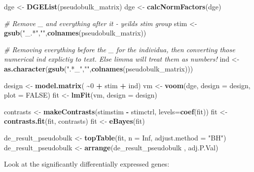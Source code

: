 \documentclass[
]{book}
\newenvironment{Shaded}{\begin{snugshade}}{\end{snugshade}}
\newcommand{\AttributeTok}[1]{\textcolor[rgb]{0.13,0.29,0.53}{#1}}
\newcommand{\CommentTok}[1]{\textcolor[rgb]{0.56,0.35,0.01}{\textit{#1}}}
\newcommand{\ConstantTok}[1]{\textcolor[rgb]{0.56,0.35,0.01}{#1}}
\newcommand{\DecValTok}[1]{\textcolor[rgb]{0.00,0.00,0.81}{#1}}
\newcommand{\FunctionTok}[1]{\textcolor[rgb]{0.13,0.29,0.53}{\textbf{#1}}}
\newcommand{\NormalTok}[1]{#1}
\newcommand{\OtherTok}[1]{\textcolor[rgb]{0.56,0.35,0.01}{#1}}
\newcommand{\SpecialCharTok}[1]{\textcolor[rgb]{0.81,0.36,0.00}{\textbf{#1}}}
\newcommand{\StringTok}[1]{\textcolor[rgb]{0.31,0.60,0.02}{#1}}
\begin{document}
\begin{Shaded}
\begin{Highlighting}[]
\NormalTok{dge }\OtherTok{\textless{}{-}} \FunctionTok{DGEList}\NormalTok{(pseudobulk\_matrix)}
\NormalTok{dge }\OtherTok{\textless{}{-}} \FunctionTok{calcNormFactors}\NormalTok{(dge)}

\CommentTok{\# Remove \_ and everything after it {-} yeilds stim group}
\NormalTok{stim }\OtherTok{\textless{}{-}} \FunctionTok{gsub}\NormalTok{(}\StringTok{"\_.*"}\NormalTok{,}\StringTok{""}\NormalTok{,}\FunctionTok{colnames}\NormalTok{(pseudobulk\_matrix)) }

\CommentTok{\# Removing everything before the \_ for the individua, then converting those numerical ind explictiy to text. Else limma will treat them as numbers!}
\NormalTok{ind  }\OtherTok{\textless{}{-}} \FunctionTok{as.character}\NormalTok{(}\FunctionTok{gsub}\NormalTok{(}\StringTok{".*\_"}\NormalTok{,}\StringTok{""}\NormalTok{,}\FunctionTok{colnames}\NormalTok{(pseudobulk\_matrix))) }

\NormalTok{design }\OtherTok{\textless{}{-}} \FunctionTok{model.matrix}\NormalTok{( }\SpecialCharTok{\textasciitilde{}}\DecValTok{0} \SpecialCharTok{+}\NormalTok{ stim }\SpecialCharTok{+}\NormalTok{ ind)}
\NormalTok{vm  }\OtherTok{\textless{}{-}} \FunctionTok{voom}\NormalTok{(dge, }\AttributeTok{design =}\NormalTok{ design, }\AttributeTok{plot =} \ConstantTok{FALSE}\NormalTok{)}
\NormalTok{fit }\OtherTok{\textless{}{-}} \FunctionTok{lmFit}\NormalTok{(vm, }\AttributeTok{design =}\NormalTok{ design)}

\NormalTok{contrasts }\OtherTok{\textless{}{-}} \FunctionTok{makeContrasts}\NormalTok{(stimstim }\SpecialCharTok{{-}}\NormalTok{ stimctrl, }\AttributeTok{levels=}\FunctionTok{coef}\NormalTok{(fit))}
\NormalTok{fit }\OtherTok{\textless{}{-}} \FunctionTok{contrasts.fit}\NormalTok{(fit, contrasts)}
\NormalTok{fit }\OtherTok{\textless{}{-}} \FunctionTok{eBayes}\NormalTok{(fit)}

\NormalTok{de\_result\_pseudobulk }\OtherTok{\textless{}{-}} \FunctionTok{topTable}\NormalTok{(fit, }\AttributeTok{n =} \ConstantTok{Inf}\NormalTok{, }\AttributeTok{adjust.method =} \StringTok{"BH"}\NormalTok{)}
\NormalTok{de\_result\_pseudobulk }\OtherTok{\textless{}{-}} \FunctionTok{arrange}\NormalTok{(de\_result\_pseudobulk , adj.P.Val)}
\end{Highlighting}
\end{Shaded}

Look at the significantly differentially expressed genes:
\end{document}
